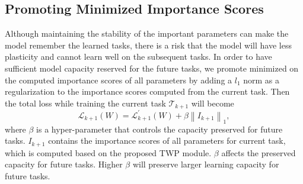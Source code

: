 \documentclass[letterpaper]{article} %
\begin{document}
\subsection{Promoting Minimized Importance Scores}
Although maintaining the stability of the important parameters can make the model
remember the learned tasks, there is a risk that the model
will have less plasticity and cannot learn well on the subsequent tasks.
In order to have sufficient model capacity reserved for the future tasks,
we promote minimized on the computed importance scores 
of all parameters by adding 
a $l_1$ norm as a regularization to the importance scores 
computed from the current task.
Then the total loss while training the current task 
$\mathcal{T}_{k+1}$ will become
\begin{equation}
\label{totalloss}
  \mathcal{L}_{k+1}(W) = \mathcal{L}^{'}_{k+1}(W) + \beta  \left\| I_{k+1}  \right\|_1,
\end{equation}
\noindent where $\beta$ is a hyper-parameter that 
controls the capacity preserved for future tasks. 
$I_{k+1}$ contains the importance scores of all parameters 
for current task, which is 
computed based on the proposed TWP module.
$\beta$ affects the preserved capacity for future tasks. 
Higher $\beta$ will preserve larger learning capacity for
future tasks.
\end{document}
